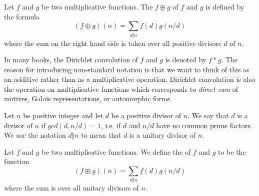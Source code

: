 \begin{definition}
Let $f$ and $g$ be two multiplicative functions. The  $f \oplus g$ of $f$ and $g$ is defined by the formula
$$ (f \oplus g)(n) =  \sum_{d \vert n} f(d) g(n/d)  $$
where the sum on the right hand side is taken over all positive divisors $d$ of $n$. 
\end{definition}
In many books, the Dirichlet convolution of $f$ and $g$ is denoted by $f * g$. The reason for introducing non-standard notation is that we want to think of this as an additive rather than as a multiplicative operation. Dirichlet convolution is also the operation on multiplicative functions which corresponds to \emph{direct sum} of motives, Galois representations, or automorphic forms.


\begin{definition}
Let $n$ be positive integer and let $d$ be a positive divisor of $n$. We say that $d$ is a  divisor of $n$ if $gcd(d, n/d) = 1$, i.e. if $d$ and $n/d$ have no common prime factors. We use the notation $d \Vert n$ to mean that $d$ is a unitary divisor of $n$. 
\end{definition}

\begin{definition}
Let $f$ and $g$ be two multiplicative functions. We define the  of $f$ and $g$ to be the function
$$ (f \boxplus g)(n) =  \sum_{d \Vert n} f(d) g(n/d)  $$
where the sum is over all unitary divisors of $n$. 
\end{definition}

